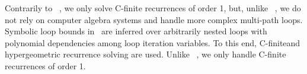 Contrarily to ~\cite{Henzinger:2008:VVT:1484209.1484240}, we only solve C-finite recurrences of order 1, but, unlike ~\cite{Henzinger:2008:VVT:1484209.1484240}, we do not rely on computer algebra systems and handle more complex multi-path loops.
Symbolic loop bounds in~\cite{10.1007/978-3-642-17511-4_7} are inferred over arbitrarily nested loops with polynomial dependencies among loop iteration variables. 
To this end, C-finiteand hypergeometric recurrence solving are used.
Unlike ~\cite{10.1007/978-3-642-17511-4_7}, we only handle C-finite recurrences of order 1.










